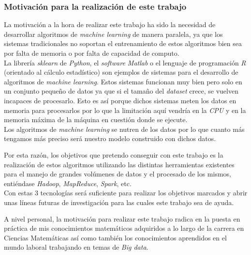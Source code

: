 \subsubsection*{Motivación para la realización de este trabajo}
La motivación a la hora de realizar este trabajo ha sido la necesidad de desarrollar algoritmos 
de \textit{machine learning} de manera paralela, ya que los sistemas tradicionales no soportan 
el entrenamiento de estos algoritmos bien sea por falta de memoria o por falta de capacidad de computo.\\
La librería \textit{sklearn} de \textit{Python}, el \textit{software Matlab} o el lenguaje de programación \textit{R}
(orientado al cálculo estadístico) son ejemplos de sistemas para el desarrollo de algoritmos de \textit{machine learning}.
Estos sistemas funcionan muy bien pero solo en un conjunto pequeño de datos ya que si el tamaño del \textit{dataset}
crece, se vuelven incapaces de procesarlo. Esto es así porque dichos sistemas meten los datos en memoria para
procesarlos por lo que la limitación aquí vendría en la \textit{CPU} y en la memoria máxima de la máquina en cuestión 
donde se ejecute.\\
Los algoritmos de \textit{machine learning} se nutren de los datos por lo que cuanto más tengamos más
preciso será nuestro modelo construido con dichos datos.

Por esta razón, los objetivos que pretendo conseguir con este trabajo es la realización de estos 
algoritmos utilizando las distintas herramientas existentes para el manejo de grandes volúmenes de 
datos y el procesado de los mismos, entiéndase \textit{Hadoop}, \textit{MapReduce}, \textit{Spark}, etc.\\
Con estas 3 tecnologías será suficiente para realizar los objetivos marcados y abrir unas líneas futuras 
de investigación para las cuales este trabajo sea de ayuda.
\newline

A nivel personal, la motivación para realizar este trabajo radica en la puesta en práctica de mis conocimientos
matemáticos adquiridos a lo largo de la carrera en Ciencias Matemáticas así como también los conocimientos
aprendidos en el mundo laboral trabajando en temas de \textit{Big data}.

\newpage

